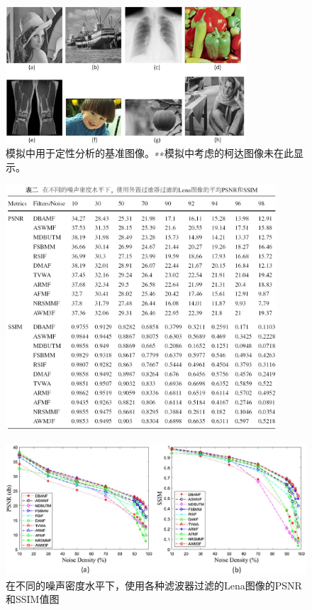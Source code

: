 \documentclass[12pt]{article} %
\begin{document}
\begin{figure}[H]
    \centering
    \includegraphics[width=0.8\textwidth]{images/04.eps}    
    \caption{模拟中用于定性分析的基准图像。∗∗模拟中考虑的柯达图像未在此显示。}
    \label{fig3}
\end{figure}
\begin{figure}[H]
    \centering
    \includegraphics[width=0.9\textwidth]{images/03.eps}  
    \label{table2} 
\end{figure}
\begin{figure}[H]
    \centering
    \includegraphics[width=1\textwidth]{images/05.eps}    
    \caption{在不同的噪声密度水平下，使用各种滤波器过滤的Lena图像的PSNR和SSIM值图}
    \label{fig4}
\end{figure}
\end{document}
